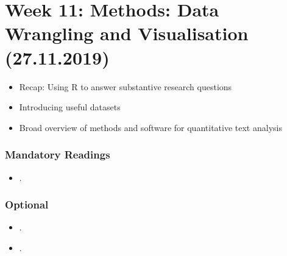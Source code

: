 \documentclass[abstract=on,parskip=full,headings=standardclasses,fontsize=11pt,paper=a4]{scrartcl}
\begin{document}
\section{Week 11: Methods: Data Wrangling and Visualisation (27.11.2019)}


\begin{itemize}
\renewcommand\labelitemi{--}
\item Recap: Using \textsf{R} to answer substantive research questions
\item Introducing  useful datasets
\item Broad overview of methods and software for quantitative text analysis
\end{itemize}

\subsubsection*{Mandatory Readings}
\begin{itemize}
\item {}.
\end{itemize}


\subsubsection*{Optional}
\begin{itemize}
\item {}.
\item {}.
\end{itemize}
\end{document}
